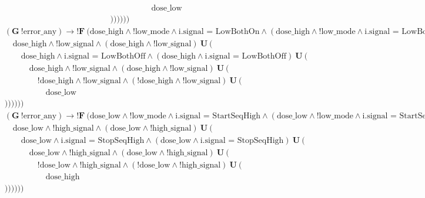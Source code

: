 \documentclass[a4paper,10pt]{article}
\newcommand{\LTLG}{\mathbf{G~}}
\newcommand{\LTLF}{\mathbf{F~}}
\newcommand{\LTLU}{\mathbf{~U~}}
\newcommand{\imply}{\rightarrow}
\newcommand{\doselow}{\textrm{dose\_low}}
\newcommand{\dosehigh}{\textrm{dose\_high}}
\newcommand{\lowsignal}{\textrm{low\_signal}}
\newcommand{\highsignal}{\textrm{high\_signal}}
\newcommand{\errorany}{\textrm{error\_any}}
\newcommand{\lowmode}{\textrm{low\_mode}}
\begin{document}
\begin{enumerate}
\begin{align*}
				&					\hspace{5em}\doselow \\
				&))))))
			\end{align*}
			\begin{align*}
				&(\LTLG !\errorany) \imply !\LTLF (\dosehigh \land !\lowmode \land \textrm{i.signal = LowBothOn} \land (\dosehigh \land !\lowmode \land \textrm{i.signal = LowBothOn}) \LTLU ( \\
				&	\hspace{1em}\dosehigh \land !\lowsignal \land (\dosehigh \land !\lowsignal) \LTLU ( \\
				&		\hspace{2em}\dosehigh \land \textrm{i.signal = LowBothOff} \land (\dosehigh \land \textrm{i.signal = LowBothOff}) \LTLU ( \\
				&			\hspace{3em}\dosehigh \land !\lowsignal \land (\dosehigh \land !\lowsignal) \LTLU ( \\
				&				\hspace{4em}!\dosehigh \land !\lowsignal \land (!\dosehigh \land !\lowsignal) \LTLU ( \\
				&					\hspace{5em}\doselow \\
				&))))))
			\end{align*}
			\begin{align*}
				&(\LTLG !\errorany) \imply !\LTLF (\doselow \land !\lowmode \land \textrm{i.signal = StartSeqHigh} \land (\doselow \land !\lowmode \land \textrm{i.signal = StartSeqHigh}) \LTLU ( \\
				&	\hspace{1em}\doselow \land !\highsignal \land (\doselow \land !\highsignal) \LTLU ( \\
				&		\hspace{2em}\doselow \land \textrm{i.signal = StopSeqHigh} \land (\doselow \land \textrm{i.signal = StopSeqHigh}) \LTLU ( \\
				&			\hspace{3em}\doselow \land !\highsignal \land (\doselow \land !\highsignal) \LTLU ( \\
				&				\hspace{4em}!\doselow \land !\highsignal \land (!\doselow \land !\highsignal) \LTLU ( \\
				&					\hspace{5em}\dosehigh \\
				&))))))
			\end{align*}
			\begin{align*}

\end{align*}
\end{enumerate}
\end{document}
